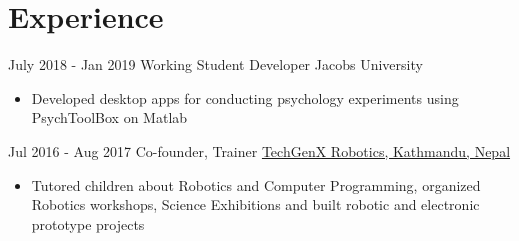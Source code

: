 \documentclass[letterpaper]{twentysecondcv} %
\begin{document}
\section{Experience}

\begin{twenty} %
    \twentyitem
    	{July 2018 -}
		{Jan 2019}
        {Working Student Developer}
        {Jacobs University}
        {}
        {\begin{itemize}
        \item Developed  desktop apps for conducting psychology experiments using PsychToolBox on Matlab \\
        \end{itemize}} 
    \begin{comment}    
    \twentyitem
   		{June 2018 -}
		{Present}
        {Business Development Manager- Germany}
        {\href{http://www.boldcode.io}{Boldcode.io, Paris, France}}
        {}
        {
        {\begin{itemize}
        \item Contacted clients and managed client portfolio for Software and Web Development outsourcing projects
    \end{itemize}}
        }
    \end{comment}
        
        \twentyitem
   		{Jul 2016 -}
		{Aug 2017}
        {Co-founder, Trainer}
        {\href{https://techgenxblog.wordpress.com}{TechGenX Robotics, Kathmandu, Nepal}}
        
        {
        {\begin{itemize}
        \item Tutored children about Robotics and Computer Programming, organized Robotics workshops, Science Exhibitions and built robotic and electronic prototype projects 
        \end{itemize}}}
        
   

\end{twenty}
\end{document}
